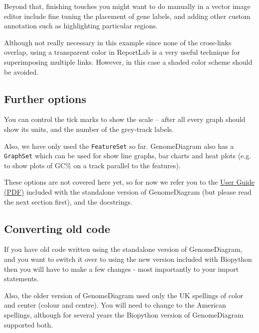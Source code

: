 Beyond that, finishing touches you might want to do manually in a vector
image editor include fine tuning the placement of gene labels, and adding
other custom annotation such as highlighting particular regions.

Although not really necessary in this example since none of the cross-links
overlap, using a transparent color in ReportLab is a very useful technique
for superimposing multiple links. However, in this case a shaded color
scheme should be avoided.

\subsection{Further options}

You can control the tick marks to show the scale -- after all every graph
should show its units, and the number of the grey-track labels.

Also, we have only used the \verb|FeatureSet| so far. GenomeDiagram also has
a \verb|GraphSet| which can be used for show line graphs, bar charts and heat
plots (e.g. to show plots of GC\% on a track parallel to the features).

These options are not covered here yet, so for now we refer you to the
\href{http://biopython.org/DIST/docs/GenomeDiagram/userguide.pdf}
{User Guide (PDF)} included with the standalone version of GenomeDiagram (but
please read the next section first), and the docstrings.

\subsection{Converting old code}

If you have old code written using the standalone version of GenomeDiagram, and
you want to switch it over to using the new version included with Biopython then
you will have to make a few changes - most importantly to your import statements.

Also, the older version of GenomeDiagram used only the UK spellings of color and
center (colour and centre).  You will need to change to the American spellings,
although for several years the Biopython version of GenomeDiagram supported both.

